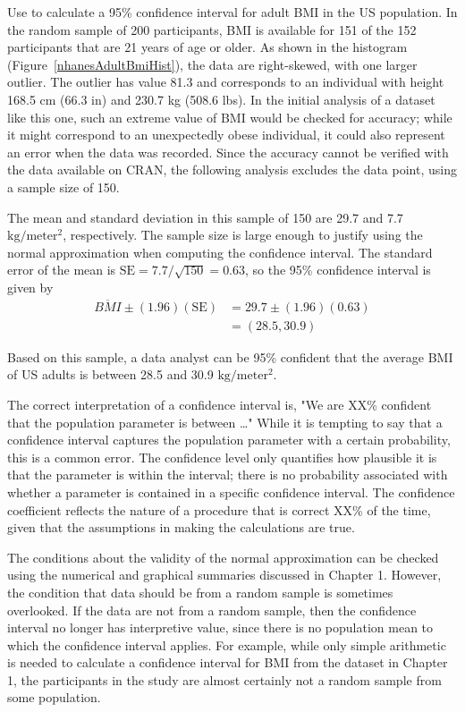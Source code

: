 \begin{spacing}{1.5}
\begin{example}{Use  to calculate a 95\% confidence interval for adult BMI in the US population. \label{exNhanesBmi}}
	In the random sample of 200 participants, BMI is available for 151 of the 152 participants that are 21 years of age or older. As shown in the histogram (Figure~\ref{nhanesAdultBmiHist}), the data are right-skewed, with one larger outlier. The outlier has value 81.3 and corresponds to an individual with height 168.5 cm (66.3 in) and 230.7 kg (508.6 lbs). In the initial analysis of a dataset like this one, such an extreme value of BMI would be checked for accuracy; while it might correspond to an unexpectedly obese individual, it could also represent an error when the data was recorded. Since the accuracy cannot be verified with the data available on CRAN, the following analysis excludes the data point, using a sample size of 150.
	
	The mean and standard deviation in this sample of 150 are 29.7 and 7.7 $\text{kg}/\text{meter}{^2}$, respectively.  The sample size is large enough to justify using the normal approximation when computing the confidence interval.  The standard error of the mean is $\text{SE} = 7.7/\sqrt{150} = 0.63$, so the 95\% confidence interval is given by 
\begin{align*}
	\overline{BMI} \pm (1.96)(\text{SE}) &= 29.7 \pm (1.96)(0.63) \\
	&= (28.5, 30.9)
\end{align*}	
	
	Based on this sample, a data analyst can be 95\% confident that the average BMI of US adults is between 28.5 and 30.9 $\text{kg}/\text{meter}{^2}$.
\end{example}

The correct interpretation of a confidence interval is, "We are XX\% confident that the population parameter is between \dots" While it is tempting to say that a confidence interval captures the population parameter with a certain probability, this is a common error. The confidence level only quantifies how plausible it is that the parameter is within the interval; there is no probability associated with whether a parameter is contained in a specific confidence interval. The confidence coefficient reflects the nature of a procedure that is correct XX\% of the time, given that the assumptions in making the calculations are true.

The conditions about the validity of the normal approximation can be checked using the numerical and graphical summaries discussed in Chapter 1. However, the condition that data should be from a random sample is sometimes overlooked. If the data are not from a random sample, then the confidence interval no longer has interpretive value, since there is no population mean to which the confidence interval applies. For example, while only simple arithmetic is needed to calculate a confidence interval for BMI from the  dataset in Chapter 1, the participants in the study are almost certainly not a random sample from some population. 


\end{spacing}
